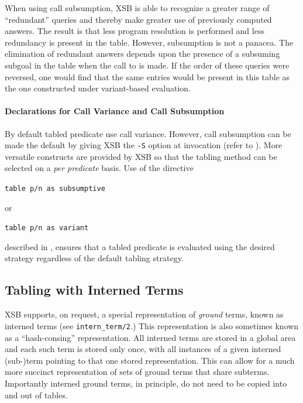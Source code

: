 %
When using call subsumption, XSB is able to recognize a greater range
of ``redundant'' queries and thereby make greater use of previously
computed answers.  The result is that less program resolution is
performed and less redundancy is present in the table.  However,
subsumption is not a panacea.  The elimination of redundant answers
depends upon the presence of a subsuming subgoal in the table when the
call to  is made.  If the order of these queries were
reversed, one would find that the same entries would be present in
this table as the one constructed under variant-based evaluation.

\paragraph{Declarations for Call Variance and Call Subsumption}
By default tabled predicate use call variance.  However, call
subsumption can be made the default by giving XSB the \verb|-S| option
at invocation (refer to ).  More versatile
constructs are provided by XSB so that the tabling method can be
selected on a \emph{per predicate} basis.  Use of the directive

{\tt table p/n as subsumptive}

or 

{\tt table p/n as variant}

described in , ensures that a tabled
predicate is evaluated using the desired strategy regardless of the
default tabling strategy.

\subsection{Tabling with Interned Terms} \label{section:interntabling}

XSB supports, on request, a special representation of {\em ground}
terms, known as interned terms (see {\tt intern\_term/2}.)  This
representation is also sometimes known as a ``hash-consing''
representation.  All interned terms are stored in a global area and
each such term is stored only once, with all instances of a given
interned (sub-)term pointing to that one stored representation.  This
can allow for a much more succinct representation of sets of ground
terms that share subterms.  Importantly interned ground terms, in
principle, do not need to be copied into and out of tables.

